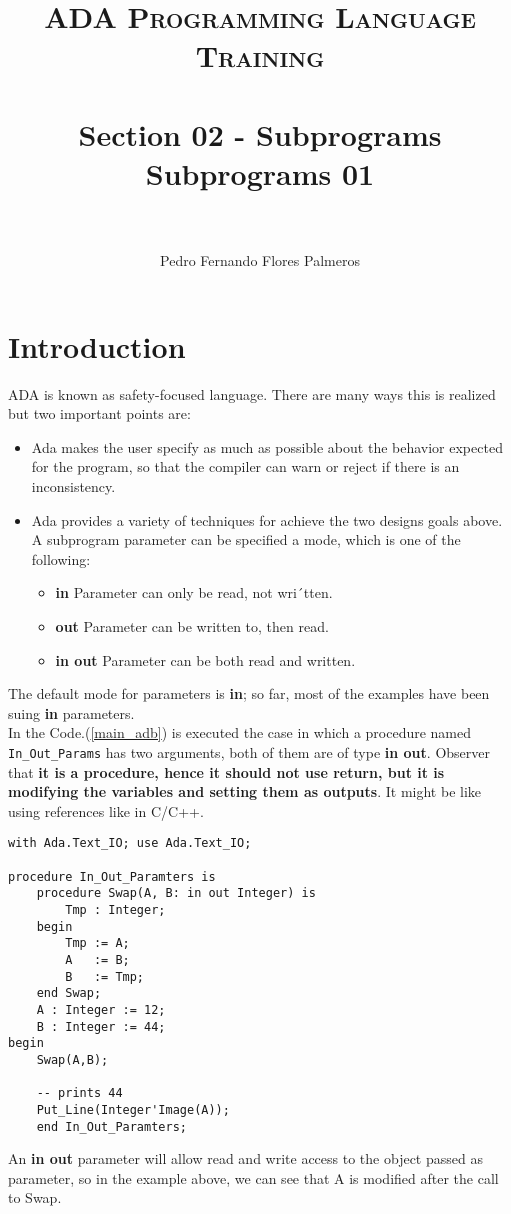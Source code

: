 \documentclass[paper=a4, fontsize=11pt]{scrartcl} %
\title{	
\normalfont \normalsize 
\textsc{ADA Programming Language Training} \\ [25pt] %
\horrule{0.5pt} \\[0.4cm] %
\huge Section 02 - Subprograms \\ Subprograms 01\\ %
\horrule{2pt} \\[0.5cm] %
}
\author{Pedro Fernando Flores Palmeros} %
\date{} %
\numberwithin{equation}{section} %
\numberwithin{figure}{section} %
\numberwithin{table}{section} %
\newcommand{\refCode}[1]{Code.(\ref{#1})}
\begin{document}
\maketitle %
 

\section{Introduction}
ADA is known as safety-focused language. There are many ways this is realized but two important points are: 

\begin{itemize}
	\item Ada makes the user specify as much as possible about the behavior expected for the program, so that the compiler can warn or reject if there is an inconsistency.
	\item Ada provides a variety of techniques for achieve the two designs goals above. A subprogram parameter can be specified a mode, which is one of the following:
	\begin{itemize}
		\item \textbf{in} Parameter can only be read, not wri´tten.
		\item \textbf{out} Parameter can be written to, then read.
		\item \textbf{in out} Parameter can be both read and written.
	\end{itemize}
\end{itemize}
The default mode for parameters is \textbf{in}; so far, most of the examples have been suing \textbf{in} parameters.\\

In the \refCode{main_adb} is executed the case in which a procedure named \verb|In_Out_Params| has two arguments, both of them are of type \textbf{in out}. Observer that \textbf{it is a procedure, hence it should not use return, but it is modifying the variables and setting them as outputs}. It might be like using references like in C/C++.

\begin{lstlisting}[caption = {main.adb}, label = {main_adb}]
with Ada.Text_IO; use Ada.Text_IO;

procedure In_Out_Paramters is
	procedure Swap(A, B: in out Integer) is 
		Tmp : Integer;
	begin 
		Tmp := A; 
		A   := B;
		B   := Tmp;
	end Swap;
	A : Integer := 12;
	B : Integer := 44;
begin 
	Swap(A,B);

	-- prints 44
	Put_Line(Integer'Image(A));
	end In_Out_Paramters;
\end{lstlisting}

An \textbf{in out} parameter will allow read and write access to the object passed as parameter, so in the example above, we can see that A is modified after the call to Swap.
\end{document}
